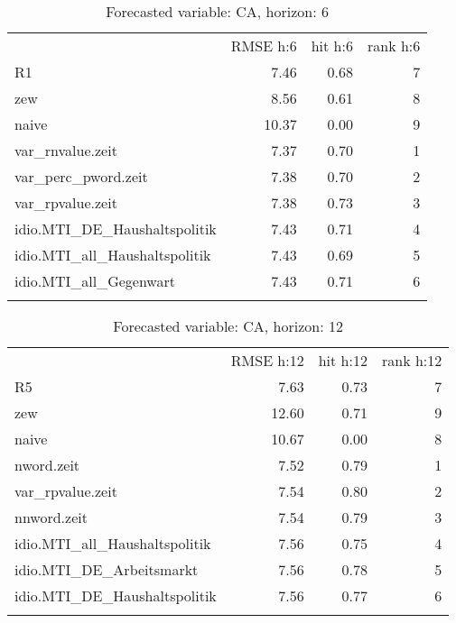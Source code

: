 \documentclass[11pt,]{article}
\begin{document}
\begin{longtable}[c]{@{}lrrr@{}}
\toprule\addlinespace
& RMSE h:6 & hit h:6 & rank h:6
\\\addlinespace
\midrule\endhead
R1 & 7.46 & 0.68 & 7
\\\addlinespace
zew & 8.56 & 0.61 & 8
\\\addlinespace
naive & 10.37 & 0.00 & 9
\\\addlinespace
var\_rnvalue.zeit & 7.37 & 0.70 & 1
\\\addlinespace
var\_perc\_pword.zeit & 7.38 & 0.70 & 2
\\\addlinespace
var\_rpvalue.zeit & 7.38 & 0.73 & 3
\\\addlinespace
idio.MTI\_DE\_Haushaltspolitik & 7.43 & 0.71 & 4
\\\addlinespace
idio.MTI\_all\_Haushaltspolitik & 7.43 & 0.69 & 5
\\\addlinespace
idio.MTI\_all\_Gegenwart & 7.43 & 0.71 & 6
\\\addlinespace
\bottomrule
\addlinespace
\caption{Forecasted variable: CA, horizon: 6}
\end{longtable}

\begin{longtable}[c]{@{}lrrr@{}}
\toprule\addlinespace
& RMSE h:12 & hit h:12 & rank h:12
\\\addlinespace
\midrule\endhead
R5 & 7.63 & 0.73 & 7
\\\addlinespace
zew & 12.60 & 0.71 & 9
\\\addlinespace
naive & 10.67 & 0.00 & 8
\\\addlinespace
nword.zeit & 7.52 & 0.79 & 1
\\\addlinespace
var\_rpvalue.zeit & 7.54 & 0.80 & 2
\\\addlinespace
nnword.zeit & 7.54 & 0.79 & 3
\\\addlinespace
idio.MTI\_all\_Haushaltspolitik & 7.56 & 0.75 & 4
\\\addlinespace
idio.MTI\_DE\_Arbeitsmarkt & 7.56 & 0.78 & 5
\\\addlinespace
idio.MTI\_DE\_Haushaltspolitik & 7.56 & 0.77 & 6
\\\addlinespace
\bottomrule
\addlinespace
\caption{Forecasted variable: CA, horizon: 12}
\end{longtable}
\end{document}
